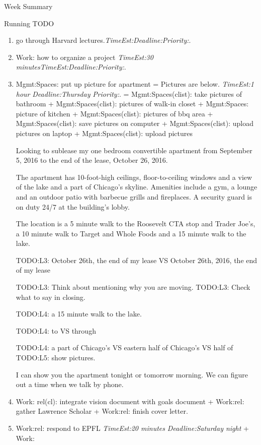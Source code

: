 \documentclass[serif, mathserif, final]{beamer}
\newcommand{\te}[1]{\textit{TimeEst:}\textit{#1}}
\newcommand{\dl}[1]{\textit{Deadline:}\textit{#1}}
\newcommand{\pr}[1]{\textit{Priority:}\textit{#1}}
\begin{document}
\begin{frame}
\begin{columns}
\begin{column}{0.5\linewidth}
\begin{block}{Week Summary}
\begin{block}{Running TODO}
\begin{enumerate}
      \item \tiny go through Harvard lectures.\te{}\dl{}\pr{}. 

      \item \tiny Work: how to organize a project \te{30
        minutes}\te{}\dl{}\pr{}.


\item \tiny Mgmt:Spaces: put up picture for apartment =  
Pictures are below.  \te{1 hour} \dl{Thursday} \pr{}.  
= Mgmt:Spaces(clist): take pictures of bathroom + Mgmt:Spaces(clist):
pictures of walk-in closet + Mgmt:Spaces: picture of kitchen +
Mgmt:Spaces(clist): pictures of bbq area + Mgmt:Spaces(clist): save pictures
on computer + Mgmt:Spaces(clist): upload pictures on laptop +
Mgmt:Spaces(clist): upload pictures 

Looking to sublease my one bedroom convertible apartment from
September 5, 2016 to the end of the lease, October 26, 2016.

The apartment has 10-foot-high ceilings, floor-to-ceiling windows and
a view of the lake and a part of Chicago's skyline. Amenities include
a gym, a lounge and an outdoor patio with barbecue grills and
fireplaces. A security guard is on duty 24/7 at the building's lobby.

The location is a 5 minute walk to the Roosevelt CTA stop and Trader
Joe's, a 10 minute walk to Target and Whole Foods and a 15 minute walk
to the lake.
 
TODO:L3: October 26th, the end of my lease VS October 26th,
2016, the end of my lease 

TODO:L3: Think about mentioning why you are moving. 
TODO:L3: Check what to say in closing. 

TODO:L4: a 15 minute walk to the lake. 

TODO:L4: to VS through 

TODO:L4: a part of Chicago's VS eastern half of Chicago's VS half of 
TODO:L5: show pictures. 

I can show you the apartment tonight or tomorrow morning. We can figure out a time when
we talk by phone. 




      \item \tiny Work: rel(cl): integrate vision document with goals
        document + Work:rel: gather Lawrence Scholar +  Work:rel:
        finish cover letter.
        
      \item \tiny Work:rel: respond to EPFL \te{20 minutes}
        \dl{Saturday night} + Work: 


\end{enumerate}
\end{block}
\end{block}
\end{column}
\end{columns}
\end{frame}
\end{document}
